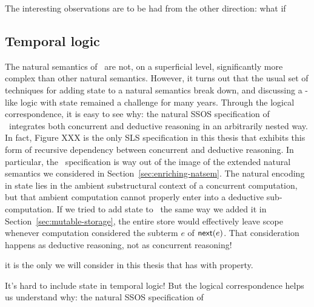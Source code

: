 The interesting observations are to be had from the other direction: what if

\subsection{Temporal logic}

The natural semantics of \rowan~are not, on a superficial level,
significantly more complex than other natural semantics. However, it
turns out that the usual set of techniques for adding state to a
natural semantics break down, and discussing a \rowan-like logic with
state remained a challenge for many years. Through the
logical correspondence, it is easy to see why: the natural SSOS
specification of \rowan~integrates both concurrent and deductive
reasoning in an arbitrarily nested way. In fact, Figure XXX is the
only SLS specification in this thesis that exhibits this form of
recursive dependency between concurrent and deductive reasoning.  In
particular, the \rowan~specification is way out of the image of the
extended natural semantics we considered in
Section~\ref{sec:enriching-natsem}. The natural encoding in state lies
in the ambient substructural context of a concurrent computation, but
that ambient computation cannot properly enter into a deductive
sub-computation. If we tried to add state to \rowan~the same way we
added it in Section~\ref{sec:mutable-storage}, the entire store
would effectively leave scope whenever computation considered
the subterm $e$ of ${\sf next}(e)$. That consideration happens
as deductive reasoning, not as concurrent reasoning!

 it is the only we
will consider in this thesis that has with property.

It's hard to include state in temporal logic! But the logical correspondence
helps us understand why: the natural SSOS specification of 

